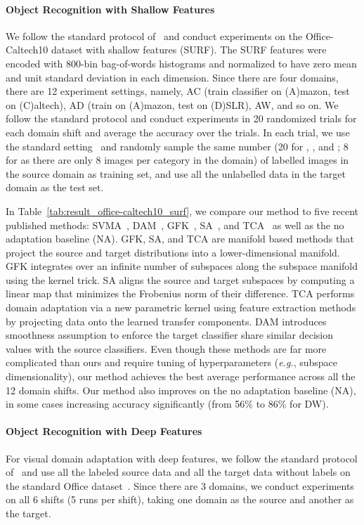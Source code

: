 \documentclass[graybox]{svmult}
\newcommand\eg{\emph{e.g.}}
\begin{document}
\paragraph{\textbf{Object Recognition with Shallow Features}}
We follow the standard protocol of~\cite{gfk,sa,gopalan-iccv11,ref:kulis_cvpr11,saenko2010adapting} and conduct experiments on the Office-Caltech10 dataset with shallow features (SURF).
The SURF features were encoded with 800-bin bag-of-words histograms and normalized to have zero mean and unit standard deviation in each dimension.  Since there are four domains, there are 12 experiment settings, namely, AC (train classifier on (A)mazon, test on (C)altech), AD (train on (A)mazon, test on (D)SLR), AW, and so on. We follow the standard protocol and conduct experiments in 20 randomized trials for each domain shift and average the accuracy over the trials. In each trial, we use the standard setting~\cite{gfk,sa,gopalan-iccv11,ref:kulis_cvpr11,saenko2010adapting} and randomly sample the same number (20 for , , and ; 8 for  as there are only 8 images per category in the  domain) of labelled images in the source domain as training set, and use all the unlabelled data in the target domain as the test set. 

In Table~\ref{tab:result_office-caltech10_surf}, we compare our method to five recent published methods: SVMA~\cite{svma}, DAM~\cite{ref:duan09}, GFK~\cite{gfk}, SA~\cite{sa}, and TCA~\cite{tca} as well as the no adaptation baseline (NA). GFK, SA, and TCA are manifold based methods that project the source and target distributions into a lower-dimensional manifold. GFK integrates over an infinite number of subspaces along the subspace manifold using the kernel trick. SA aligns the source and target subspaces by computing a linear map that minimizes the Frobenius norm of their difference. TCA performs domain adaptation via a new parametric kernel using feature extraction methods by projecting data onto the learned transfer components. DAM introduces smoothness assumption to enforce the target classifier share similar decision values with the source classifiers. Even though these methods are far more complicated than ours and require tuning of hyperparameters (\eg, subspace dimensionality), our method achieves the best average performance across all the 12 domain shifts. Our method also improves on the no adaptation baseline (NA), in some cases increasing accuracy significantly (from 56\% to 86\% for DW).

\paragraph{\textbf{Object Recognition with Deep Features}} 
For visual domain adaptation with deep features, we follow the standard protocol of~\cite{gfk,dan_long15,decaf,tzeng_arxiv15,reversegrad} and use all the labeled source data and all the target data without labels on the standard Office dataset~\cite{saenko2010adapting}. Since there are 3 domains, we conduct experiments on all 6 shifts (5 runs per shift), taking one domain as the source and another as the target. 
\end{document}

